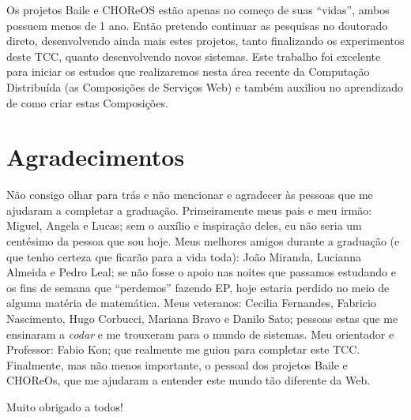 \documentclass[11pt,a4paper]{article}
\begin{document}
Os projetos Baile e CHOReOS estão apenas no começo de suas ``vidas'', ambos possuem menos de 1 ano. Então pretendo continuar as pesquisas no doutorado direto, desenvolvendo ainda mais estes projetos, tanto finalizando os experimentos deste TCC, quanto desenvolvendo novos sistemas. Este trabalho foi excelente para iniciar os estudos que realizaremos nesta área recente da Computação Distribuída (as Composições de Serviços Web) e também auxiliou no aprendizado de como criar estas Composições.




\section{Agradecimentos}

Não consigo olhar para trás e não mencionar e agradecer às pessoas que me ajudaram a completar a graduação. Primeiramente meus pais e meu irmão: Miguel, Angela e Lucas; sem o auxílio e inspiração deles, eu não seria um centésimo da pessoa que sou hoje. Meus melhores amigos durante a graduação (e que tenho certeza que ficarão para a vida toda): João Miranda, Lucianna Almeida e Pedro Leal; se não fosse o apoio nas noites que passamos estudando e os fins de semana que ``perdemos'' fazendo EP, hoje estaria perdido no meio de alguma matéria de matemática. Meus veteranos: Cecilia Fernandes, Fabricio Nascimento, Hugo Corbucci, Mariana Bravo e Danilo Sato; pessoas estas que me ensinaram a \emph{codar} e me trouxeram para o mundo de sistemas. Meu orientador e Professor: Fabio Kon; que realmente me guiou para completar este TCC. Finalmente, mas não menos importante, o pessoal dos projetos Baile e CHOReOs, que me ajudaram a entender este mundo tão diferente da Web.

Muito obrigado a todos!
\end{document}
